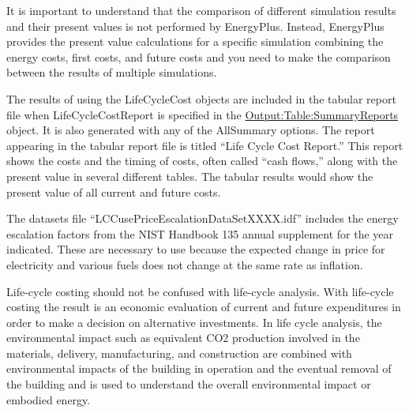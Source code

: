 It is important to understand that the comparison of different simulation results and their present values is not performed by EnergyPlus. Instead, EnergyPlus provides the present value calculations for a specific simulation combining the energy costs, first costs, and future costs and you need to make the comparison between the results of multiple simulations.

The results of using the LifeCycleCost objects are included in the tabular report file when LifeCycleCostReport is specified in the \hyperref[outputtablesummaryreports]{Output:Table:SummaryReports} object. It is also generated with any of the AllSummary options. The report appearing in the tabular report file is titled ``Life Cycle Cost Report.'' This report shows the costs and the timing of costs, often called ``cash flows,'' along with the present value in several different tables. The tabular results would show the present value of all current and future costs.

The datasets file ``LCCusePriceEscalationDataSetXXXX.idf'' includes the energy escalation factors from the NIST Handbook 135 annual supplement for the year indicated. These are necessary to use because the expected change in price for electricity and various fuels does not change at the same rate as inflation.

Life-cycle costing should not be confused with life-cycle analysis. With life-cycle costing the result is an economic evaluation of current and future expenditures in order to make a decision on alternative investments. In life cycle analysis, the environmental impact such as equivalent CO2 production involved in the materials, delivery, manufacturing, and construction are combined with environmental impacts of the building in operation and the eventual removal of the building and is used to understand the overall environmental impact or embodied energy.